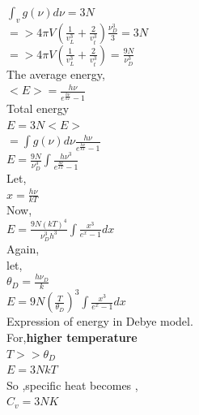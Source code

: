 \documentclass{article}
\newcommand*{\1}{\hspace{1pt}}
\begin{document}
$\int_v g(\nu)d\nu=3N$\\


$=>4\pi V(\frac{1}{v_L^3}+\frac{2}{v_t^3})\frac{\nu_D^3}{3}=3N$\\

$=>4\pi V(\frac{1}{v_L^3}+\frac{2}{v_t^3})=\frac{9N}{\nu_D^3}$\\

The average energy,\\

    $<E>=\frac{h\nu}{e^{\frac{h\nu}{kT}}-1}$\\
    
Total energy \\

$E=3N<E>$\\

$=\int g(\nu)d\nu \frac{h\nu}{e^{\frac{h\nu}{kT}}-1}$\\


$E=\frac{9N}{\nu_D^3}\int\frac{h\nu^3}{e^{\frac{h\nu}{kT}}-1}$\\

Let,\\

$x=\frac{h\nu}{kT} $\\

Now,\\

$E=\frac{9N(kT)^4}{\nu_D^3h^3}\int\frac{x^3}{e^x-1}dx$\\

Again,\\

let,\\

$\theta_D=\frac{h\nu_D}{k}$\\




$E=9N(\frac{T}{\theta_D})^3\int\frac{x^3}{e^x-1}dx$\\


Expression of energy in Debye model.\\

For,\textbf{higher temperature}\\

$T>>\theta_D$\\

$E=3NkT$\\

So ,specific heat becomes ,\\

$C_v=3NK$\\
\end{document}
